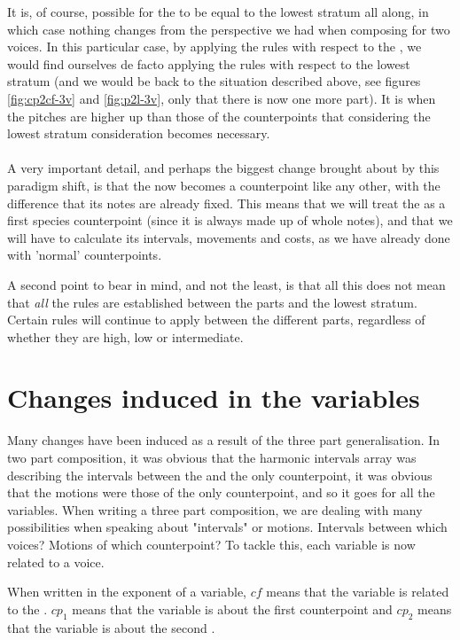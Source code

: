 It is, of course, possible for the \cf to be equal to the lowest stratum all along, in which case nothing changes from the perspective we had when composing for two voices. In this particular case, by applying the rules with respect to the \cf, we would find ourselves de facto applying the rules with respect to the lowest stratum (and we would be back to the situation described above, see figures \ref{fig:cp2cf-3v} and \ref{fig:p2l-3v}, only that there is now one more part). It is when the \cf pitches are higher up than those of the counterpoints that considering the lowest stratum consideration becomes necessary.

\paragraph{}
A very important detail, and perhaps the biggest change brought about by this paradigm shift, is that the \cf now becomes a counterpoint like any other, with the difference that its notes are already fixed. This means that we will treat the \cf as a first species counterpoint (since it is always made up of whole notes), and that we will have to calculate its intervals, movements and costs, as we have already done with 'normal' counterpoints.

A second point to bear in mind, and not the least, is that all this does not mean that \textit{all} the rules are established between the parts and the lowest stratum. Certain rules will continue to apply between the different parts, regardless of whether they are high, low or intermediate.

\section{Changes induced in the variables} \label{section:changes induced}


Many changes have been induced as a result of the three part generalisation. In two part composition, it was obvious that the harmonic intervals array was describing the intervals between the \cf and the only counterpoint, it was obvious that the motions were those of the only counterpoint, and so it goes for all the variables. When writing a three part composition, we are dealing with many possibilities when speaking about "intervals" or motions. Intervals between which voices? Motions of which counterpoint? To tackle this, each variable is now related to a voice.

When written in the exponent of a variable, $cf$ means that the variable is related to the \cf. $cp_1$ means that the variable is about the first counterpoint and $cp_2$ means that the variable is about the second \cp.

